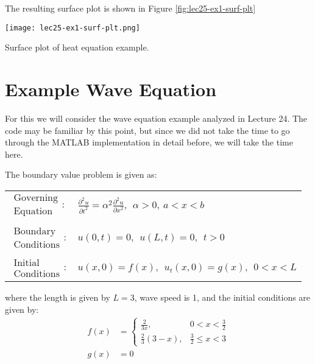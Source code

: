 \vspace{0.2cm}

\noindent The resulting surface plot is shown in Figure \ref{fig:lec25-ex1-surf-plt}

\begin{marginfigure}
\texttt{[image: lec25-ex1-surf-plt.png]}
\caption{Surface plot of heat equation example.}
\label{fig:lec25-ex1-surf-plt}
\end{marginfigure}

\section{Example Wave Equation}

For this we will consider the wave equation example analyzed in Lecture 24.  The code may be familiar by this point, but since we did not take the time to go through the MATLAB implementation in detail before, we will take the time here.

\vspace{0.15cm}

\noindent The boundary value problem is given as:
\begin{table}
\begin{tabular}{l l}
$\substack{\text{Governing} \\\text{Equation}}: $& $\frac{\partial^2 u}{\partial t^2} = \alpha^2 \frac{\partial^2 u}{\partial x^2}, \ \ \alpha > 0, \ a<x<b$  \\
& \\
$\substack{\text{Boundary} \\ \text{Conditions}}: $& $u(0,t)=0, \ \ u(L,t) = 0, \ \ t>0$\\
& \\
$\substack{\text{Initial} \\ \text{Conditions}}: $ & $u(x,0) = f(x), \ \ u_{t}(x,0) = g(x), \ \ 0<x<L $ \\
\end{tabular}
\end{table}
where the length is given by $L=3$, wave speed is 1, and the initial conditions are given by:
\begin{align*}
f(x) &= \begin{cases} \frac{2}{3x}, & 0 < x < \frac{3}{2} \\ \frac{2}{3}(3-x), & \frac{3}{2} \le x < 3 \end{cases} \\
g(x) &= 0
\end{align*}

